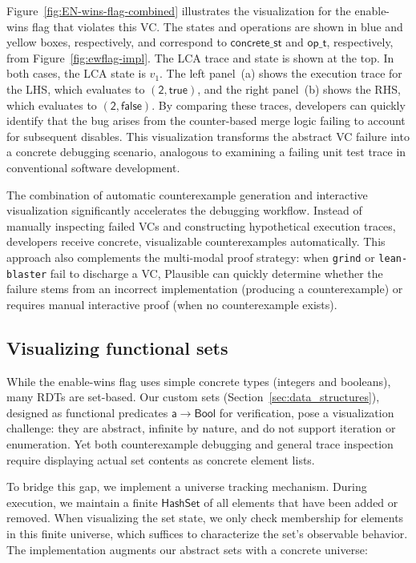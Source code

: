 \documentclass[sigplan,twocolumn,accept]{acmart}
\newcommand{\F}[1]{\mathsf{#1}}
\begin{document}
Figure~\ref{fig:EN-wins-flag-combined} illustrates the visualization for the
enable-wins flag that violates this VC. The states and operations are shown in
blue and yellow boxes, respectively, and correspond to $\F{concrete\_st}$ and $\F{op\_t}$, respectively, from Figure~\ref{fig:ewflag-impl}. The LCA trace and state is shown at the top. In both cases, the LCA state is $v_1$. The left
panel~(a) shows the execution trace for the LHS, which evaluates to
$\F{(2,true)}$, and the right panel~(b) shows the RHS, which evaluates to
$\F{(2,false)}$.  By comparing these traces, developers can quickly identify
that the bug arises from the counter-based merge logic failing to account for
subsequent disables. This visualization transforms the abstract VC failure into
a concrete debugging scenario, analogous to examining a failing unit test trace
in conventional software development.

The combination of automatic counterexample generation and interactive visualization significantly accelerates the debugging workflow. Instead of manually inspecting failed VCs and constructing hypothetical execution traces, developers receive concrete, visualizable counterexamples automatically. This approach also complements the multi-modal proof strategy: when \texttt{grind} or \texttt{lean-blaster} fail to discharge a VC, Plausible can quickly determine whether the failure stems from an incorrect implementation (producing a counterexample) or requires manual interactive proof (when no counterexample exists).

\subsection{Visualizing functional sets}

While the enable-wins flag uses simple concrete types (integers and booleans), many RDTs are set-based. Our custom sets (Section~\ref{sec:data_structures}), designed as functional predicates $\F{a} \to \F{Bool}$ for verification, pose a visualization challenge: they are abstract, infinite by nature, and do not support iteration or enumeration. Yet both counterexample debugging and general trace inspection require displaying actual set contents as concrete element lists.

To bridge this gap, we implement a universe tracking mechanism. During execution, we maintain a finite $\F{HashSet}$ of all elements that have been added or removed. When visualizing the set state, we only check membership for elements in this finite universe, which suffices to characterize the set's observable behavior. The implementation augments our abstract sets with a concrete universe:
\end{document}
